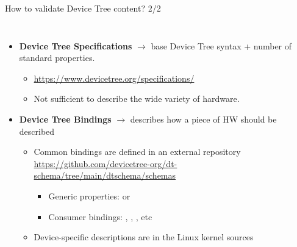 \begin{frame}[fragile]{How to validate Device Tree content? 2/2}
  \begin{columns}
    \begin{itemize}
    \item {\bf Device Tree Specifications} $\rightarrow$ base Device
      Tree syntax + number of standard properties.
      \begin{itemize}
      \item \url{https://www.devicetree.org/specifications/}
      \item Not sufficient to describe the wide variety of hardware.
      \end{itemize}
    \item {\bf Device Tree Bindings} $\rightarrow$ describes how a piece
      of HW should be described
      \begin{itemize}
      \item Common bindings are defined in an external repository
        \url{https://github.com/devicetree-org/dt-schema/tree/main/dtschema/schemas}
        \begin{itemize}
        \item Generic properties:  or
          {}
        \item Consumer bindings: , ,
          , etc
        \end{itemize}
      \item Device-specific descriptions are in the Linux kernel sources
      \end{itemize}
    \end{itemize}

\end{columns}
\end{frame}
